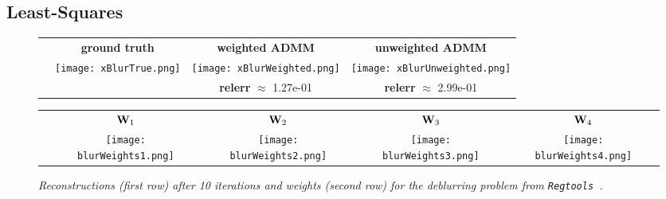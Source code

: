 \documentclass[11pt]{article}          %
\newcommand{\bfW}{{\bf W}}
\begin{document}
\subsection{Least-Squares} \label{subsec:LeastSquares}
\newcommand{\rottext}[1]{\rotatebox{90}{\hbox to 30mm{\hss #1\hss}}}
\newcommand{\rottextt}[1]{\rotatebox{90}{\hbox to 25mm{\hss #1\hss}}}
\begin{figure}[t]
  \small
  \centering
  \begin{tabular}{cccc}
    & \textbf{ground truth} & \textbf{weighted ADMM} & \textbf{unweighted ADMM}
    \\
    \rottext{\small{\textbf{deblurring}}} \hspace{-4mm}
    &
    \texttt{[image: xBlurTrue.png]}
    &
    \texttt{[image: xBlurWeighted.png]}
    &
    \texttt{[image: xBlurUnweighted.png]}
    \\
    & & \textbf{relerr} $\approx $ 1.27e-01 & \textbf{relerr} $\approx$ 2.99e-01
  \end{tabular}
  \begin{tabular}{ccccc}
    & $\bfW_1$ & $\bfW_2$ & $\bfW_3$ & $\bfW_4$ \hspace{-5mm}
    \\
    \rottextt{\small{\textbf{Weights}}} \hspace{-5mm}
    &
    \texttt{[image: blurWeights1.png]}
    &
    \texttt{[image: blurWeights2.png]}
    &
    \texttt{[image: blurWeights3.png]}
    &
    \texttt{[image: blurWeights4.png]}   
  \end{tabular}
  \caption{\textit{Reconstructions (first row) after 10 iterations and weights (second row) for the deblurring problem from \emph{\texttt{Regtools}~\cite{hansen1994regularization}}. %
  }}
  \label{fig:blur}
\end{figure}
\end{document}
